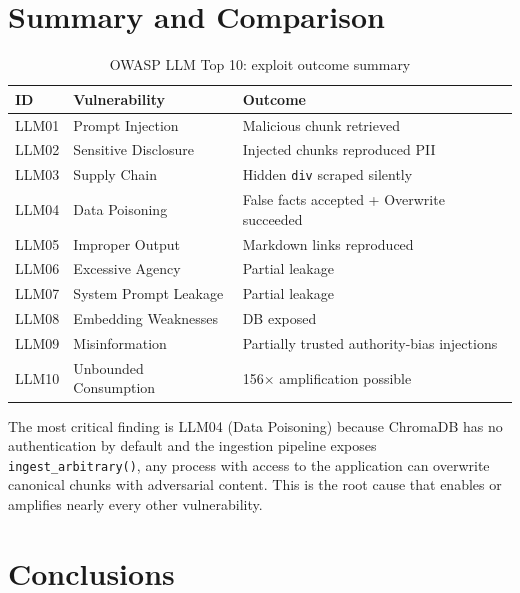 \documentclass[12pt, a4paper]{report}
\begin{document}
\chapter{Summary and Comparison}

\begin{table}[H]
      \centering
      \begin{tabularx}{\linewidth}{llX}
            \toprule
            \textbf{ID} & \textbf{Vulnerability} & \textbf{Outcome}                            \\
            \midrule
            LLM01       & Prompt Injection       & Malicious chunk retrieved                   \\
            LLM02       & Sensitive Disclosure   & Injected chunks reproduced PII              \\
            LLM03       & Supply Chain           & Hidden \texttt{div} scraped silently        \\
            LLM04       & Data Poisoning         & False facts accepted + Overwrite succeeded  \\
            LLM05       & Improper Output        & Markdown links reproduced                   \\
            LLM06       & Excessive Agency       & Partial leakage                             \\
            LLM07       & System Prompt Leakage  & Partial leakage                             \\
            LLM08       & Embedding Weaknesses   & DB exposed                                  \\
            LLM09       & Misinformation         & Partially trusted authority-bias injections \\
            LLM10       & Unbounded Consumption  & 156$\times$ amplification possible          \\
            \bottomrule
      \end{tabularx}
      \caption{OWASP LLM Top 10: exploit outcome summary}
\end{table}

The most critical finding is LLM04 (Data Poisoning) because ChromaDB has no
authentication by default and the ingestion pipeline exposes \texttt{ingest\_arbitrary()},
any process with access to the application can overwrite canonical chunks with adversarial
content. This is the root cause that enables or amplifies nearly every other vulnerability.

\chapter{Conclusions}
\end{document}
